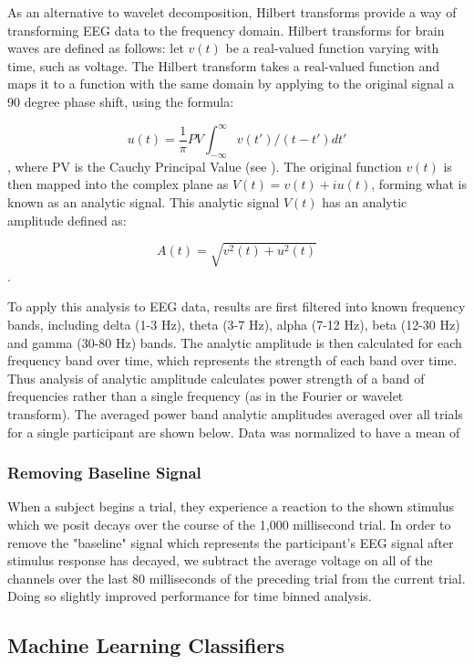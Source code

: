 \documentclass[12pt]{report}
\begin{document}
	
	As an alternative to wavelet decomposition, Hilbert transforms provide a way of transforming EEG data to the frequency domain.  Hilbert transforms for brain waves are defined as follows\cite{Freeman}:  let $v(t)$ be a real-valued function varying with time, such as voltage.  The Hilbert transform takes a real-valued function and maps it to a function with the same domain by applying to the original signal a 90 degree phase shift, using the formula:
	
	$$
		u(t) =  \frac{1}{\pi} PV \int_{-\infty}^{\infty} v(t')/(t-t')dt'
	$$
	, where PV is the Cauchy Principal Value (see \cite{cpv}).  The original function $v(t)$ is then mapped into the complex plane as $V(t) = v(t) + iu(t)$, forming what is known as an analytic signal.  This analytic signal $V(t)$ has an analytic amplitude defined as: 
	
	$$
		A(t) = \sqrt{v^2(t) + u^2(t)}
	$$.
	
	 
	To apply this analysis to EEG data, results are first filtered into known frequency bands, including delta (1-3 Hz), theta (3-7 Hz), alpha (7-12 Hz), beta (12-30 Hz) and gamma (30-80 Hz)\cite{Freeman} bands.  The analytic amplitude is then calculated for each frequency band over time, which represents the strength of each band over time.  Thus analysis of analytic amplitude calculates power strength of a band of frequencies rather than a single frequency (as in the Fourier or wavelet transform).  The averaged power band analytic amplitudes averaged over all trials for a single participant are shown below.  Data was normalized to have a mean of 
	
	
	
	
\subsubsection{Removing Baseline Signal}
	When a subject begins a trial, they experience a reaction to the shown stimulus which we posit decays over the course of the 1,000 millisecond trial.  In order to remove the "baseline" signal which represents the participant's EEG signal after stimulus response has decayed, we subtract the average voltage on all of the channels over the last 80 milliseconds of the preceding trial from the current trial.  Doing so slightly improved performance for time binned analysis.
	
\subsection{Machine Learning Classifiers}
\end{document}
